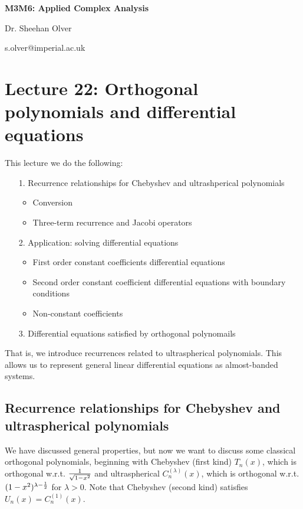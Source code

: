 \documentclass[12pt,a4paper]{article}
\def\half{ {1 \over 2} }
\begin{document}
\textbf{M3M6: Applied Complex Analysis}

Dr. Sheehan Olver

s.olver@imperial.ac.uk

\section{Lecture 22: Orthogonal polynomials and differential equations}
This lecture we do the following:

\begin{itemize}
\item[1. ] Recurrence relationships for Chebyshev and ultrashperical polynomials

\begin{itemize}
\item Conversion


\item Three-term recurrence and Jacobi operators

\end{itemize}

\item[2. ] Application: solving differential equations

\begin{itemize}
\item First order constant coefficients differential equations


\item Second order constant coefficient differential equations with boundary conditions


\item Non-constant coefficients

\end{itemize}

\item[3. ] Differential equations satisfied by orthogonal polynomails    

\end{itemize}
That is, we introduce recurrences related to ultraspherical polynomials. This allows us to represent general linear differential equations as almost-banded systems.

\subsection{Recurrence relationships for Chebyshev and ultraspherical polynomials}
We have discussed general properties, but now we want to discuss some classical orthogonal polynomials,  beginning with Chebyshev (first kind) $T_n(x)$, which is orthogonal w.r.t. $1\over \sqrt{1-x^2}$ and ultraspherical $C_n^{(\lambda)}(x)$, which is orthogonal w.r.t. $(1-x^2)^{\lambda - \half}$ for $\lambda > 0$. Note that Chebyshev (second kind) satisfies $U_n(x) = C_n^{(1)}(x)$.
\end{document}

